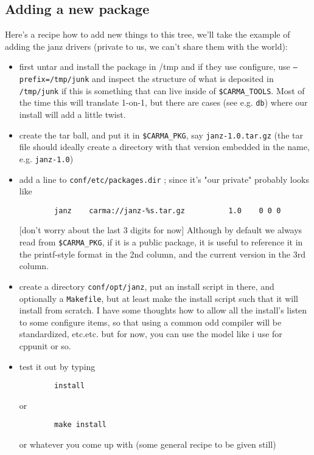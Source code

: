 \documentclass{article}
\begin{document}
\subsection{Adding a new package}

Here's a recipe how to add new things to this tree, we'll take
the example of adding the janz drivers (private to us, we can't share
them with the world):

\begin{itemize}

\item
first untar and install the package in /tmp and if they use
configure, use {\tt --prefix=/tmp/junk} and inspect the
structure of what is deposited in {\tt /tmp/junk} if this is
something that can live inside of {\tt \$CARMA\_TOOLS}. Most of the
time this will translate 1-on-1, but there are cases (see
e.g. {\tt db}) where our install will add a little twist.
 
\item
create the tar ball, and put it in {\tt \$CARMA\_PKG},
say {\tt janz-1.0.tar.gz}
(the tar file should ideally create a directory with that version
embedded in the name, e.g. {\tt janz-1.0})

\item 
add a line to {\tt conf/etc/packages.dir} ; 
since it's "our private" probably looks
like
\begin{verbatim}
        janz    carma://janz-%s.tar.gz          1.0    0 0 0
\end{verbatim}
  [don't worry about the last 3 digits for now]
\newline
Although by default we always read from  {\tt \$CARMA\_PKG},
if it is a public package, it is useful to reference it in
the printf-style format in the 2nd column, and the current version
in the 3rd column.

\item 
create a directory
{\tt conf/opt/janz}, put an install script in there, and optionally
a {\tt Makefile}, but at least make the install script such that it will
install from scratch. I have some thoughts how to allow all the
install's listen to some configure items, so that using a common
odd compiler will be standardized, etc.etc. but for now, you can use
the model like i use for cppunit or so.

\item                                                                                       
test it out by typing
\begin{verbatim}                                                                                       
        install
\end{verbatim}
or
\begin{verbatim}
        make install
\end{verbatim}
  or whatever you come up with (some general recipe to be given still)


\end{itemize}
\end{document}
